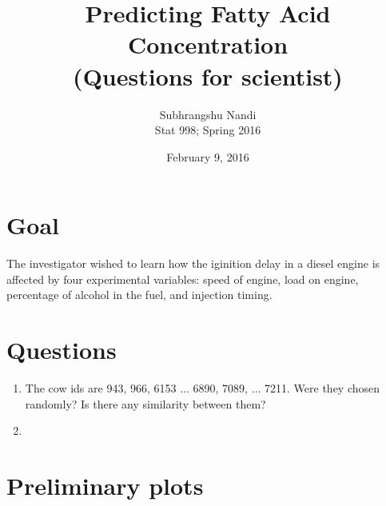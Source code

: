 \documentclass[11pt,a4paper]{article}
\begin{document}
\title{Predicting Fatty Acid Concentration \\
(Questions for scientist)}
\author{Subhrangshu Nandi\\
  Stat 998; Spring 2016}
\date{February 9, 2016}

\maketitle

\section*{Goal}
The investigator wished to learn how the iginition delay in a diesel engine is affected by four experimental variables: speed of engine, load on engine, percentage of alcohol in the fuel, and injection timing.

\section*{Questions}
\begin{enumerate}
\item The cow ids are 943, 966, 6153 $\dots$ 6890, 7089, $\dots$ 7211. Were they chosen randomly? Is there any similarity between them?
\item 
\end{enumerate}

\section*{Preliminary plots}
\end{document}
